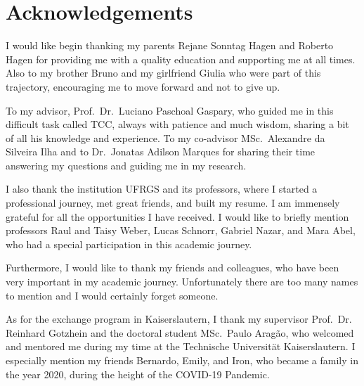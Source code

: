
\chapter*{Acknowledgements}

I would like begin thanking my parents Rejane Sonntag Hagen and Roberto Hagen for providing me with a quality education and supporting me at all times. Also to my brother Bruno and my girlfriend Giulia who were part of this trajectory, encouraging me to move forward and not to give up.

To my advisor, Prof.~Dr.~Luciano Paschoal Gaspary, who guided me in this difficult task called TCC, always with patience and much wisdom, sharing a bit of all his knowledge and experience. To my co-advisor MSc.~Alexandre da Silveira Ilha and to Dr.~Jonatas Adilson Marques for sharing their time answering my questions and guiding me in my research.

I also thank the institution UFRGS and its professors, where I started a professional journey, met great friends, and built my resume. I am immensely grateful for all the opportunities I have received. I would like to briefly mention professors Raul and Taisy Weber, Lucas Schnorr, Gabriel Nazar, and Mara Abel, who had a special participation in this academic journey.

Furthermore, I would like to thank my friends and colleagues, who have been very important in my academic journey. Unfortunately there are too many names to mention and I would certainly forget someone.

As for the exchange program in Kaiserslautern, I thank my supervisor Prof.~Dr. Reinhard Gotzhein and the doctoral student MSc.~Paulo Aragão, who welcomed and mentored me during my time at the Technische Universität Kaiserslautern. I especially mention my friends Bernardo, Emily, and Iron, who became a family in the year 2020, during the height of the COVID-19 Pandemic.


